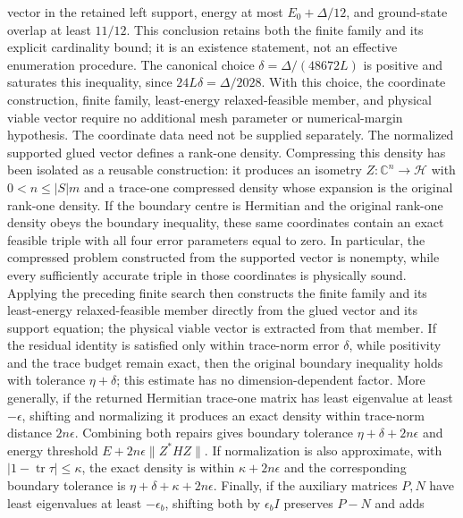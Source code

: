 \begin{lemma}
    vector in the retained left support, energy at most $E_0+\Delta/12$, and
    ground-state overlap at least $11/12$.  This conclusion retains both the
    finite family and its explicit cardinality bound; it is an existence
    statement, not an effective enumeration procedure.
    The canonical choice
    $\delta=\Delta/(48672L)$ is positive and saturates this inequality,
    since $24L\delta=\Delta/2028$.
    With this choice, the coordinate construction, finite family, least-energy
    relaxed-feasible member, and physical viable vector require no additional
    mesh parameter or numerical-margin hypothesis.
    The coordinate data need not be supplied separately.  The normalized
    supported glued vector defines a rank-one density.  Compressing this
    density has been isolated as a reusable construction: it produces an
    isometry $Z:\mathbb C^n\to\mathcal H$ with $0<n\le |S|m$ and a
    trace-one compressed density whose expansion is the original rank-one
    density.
    If the boundary centre is Hermitian and the original rank-one density
    obeys the boundary inequality, these same coordinates contain an exact
    feasible triple with all four error parameters equal to zero.  In
    particular, the compressed problem constructed from the supported vector
    is nonempty, while every sufficiently accurate triple in those
    coordinates is physically sound.
    Applying the preceding finite search then constructs the finite family
    and its least-energy relaxed-feasible member directly from the glued
    vector and its support equation; the physical viable vector is extracted
    from that member.
    If the residual identity is satisfied only within trace-norm error
    $\delta$, while positivity and the trace budget remain exact, then the
    original boundary inequality holds with tolerance $\eta+\delta$; this
    estimate has no dimension-dependent factor.
    More generally, if the returned Hermitian trace-one matrix has least
    eigenvalue at least $-\epsilon$, shifting and normalizing it produces an
    exact density within trace-norm distance $2n\epsilon$. Combining both
    repairs gives boundary tolerance $\eta+\delta+2n\epsilon$ and energy
    threshold $E+2n\epsilon\lVert Z^*HZ\rVert$.
    If normalization is also approximate, with
    $|1-\operatorname{tr}\tau|\le\kappa$, the exact density is within
    $\kappa+2n\epsilon$ and the corresponding boundary tolerance is
    $\eta+\delta+\kappa+2n\epsilon$.
    Finally, if the auxiliary matrices $P,N$ have least eigenvalues at least
    $-\epsilon_b$, shifting both by $\epsilon_b I$ preserves $P-N$ and adds

\end{lemma}
